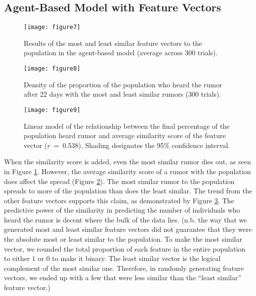 \subsection{Agent-Based Model with Feature Vectors}
\label{subsec:featvect}

\begin{figure}[H]
\captionsetup{width=0.8\textwidth}
\centering
    \texttt{[image: figure7]}
  \caption{ Results of the most and least similar feature vectors to the population in the agent-based model (average across $ 300 $ trials). }
  \label{fig:figure7}
\end{figure}

\begin{figure}[H]
\captionsetup{width=0.8\textwidth}
\centering
    \texttt{[image: figure8]}
  \caption{ Density of the proportion of the population who heard the rumor after $ 22 $ days with the most and least similar rumors ($ 300 $ trials). }
  \label{fig:figure8}
\end{figure}

\begin{figure}[H]
\captionsetup{width=0.8\textwidth}
\centering
    \texttt{[image: figure9]}
  \caption{ Linear model of the relationship between the final percentage of the population heard rumor and average similarity score of the feature vector ($ r~=~0.538 $). Shading designates the 95\% confidence interval. }
  \label{fig:figure9}
\end{figure}

When the similarity score is added, even the most similar rumor dies out, as seen in Figure \ref{fig:figure7}. However, the average similarity score of a rumor with the population does affect the spread (Figure \ref{fig:figure8}). The most similar rumor to the population spreads to more of the population than does the least similar. The trend from the other feature vectors supports this claim, as demonstrated by Figure \ref{fig:figure9}. The predictive power of the similarity in predicting the number of individuals who heard the rumor is decent where the bulk of the data lies. (n.b. the way that we generated most and least similar feature vectors did not guarantee that they were the absolute most or least similar to the population. To make the most similar vector, we rounded the total proportion of each feature in the entire population to either $ 1 $ or $ 0 $ to make it binary. The least similar vector is the logical complement of the most similar one. Therefore, in randomly generating feature vectors, we ended up with a few that were less similar than the ``least similar'' feature vector.)
